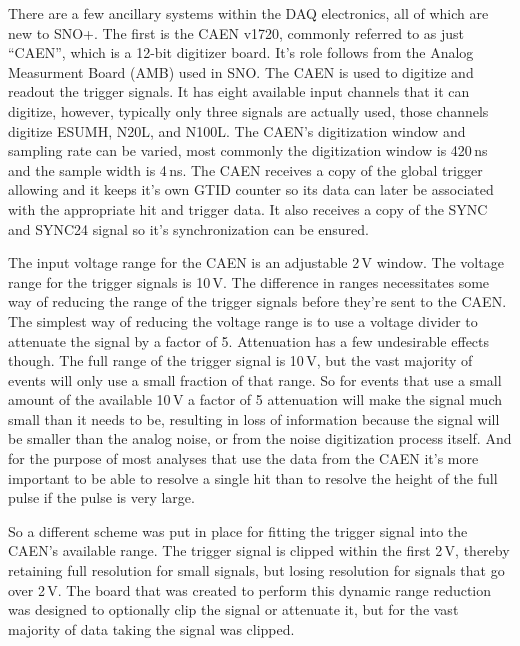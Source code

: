 There are a few ancillary systems within the DAQ electronics, all
of which are new to SNO+.
The first is the CAEN v1720, commonly
referred to as just ``CAEN'', which is a 12-bit digitizer board.
It's role follows from the Analog Measurment Board (AMB) used in
SNO.
The CAEN is used to digitize and readout the trigger signals.
It has eight available input channels that it can digitize, however,
typically only three signals are actually used, those channels digitize ESUMH, N20L, and
N100L. The CAEN's digitization window and sampling rate can be varied,
most commonly the digitization window is 420\,ns and the sample width
is 4\,ns. The CAEN receives a copy of the global trigger allowing and
it keeps it's own GTID counter so its data can later be associated
with the appropriate hit and trigger data. It also receives a copy of the
SYNC and SYNC24 signal so it's synchronization can be ensured.

The input voltage range for the CAEN is an adjustable 2\,V window.
The voltage range for the trigger signals is 10\,V.
The difference in ranges necessitates some way of reducing the range of the trigger signals
before they're sent to the CAEN.
The simplest way of reducing the voltage range is to use a voltage
divider to attenuate the signal by a factor of 5.
Attenuation has a few undesirable effects though.
The full range of the trigger signal is 10\,V, but the vast
majority of events will only use a small fraction of that range.
So for events that use a small amount of the available 10\,V a factor
of 5 attenuation will make the signal much small than it needs to be,
resulting in loss of information because the signal will be smaller than
the analog noise, or from the noise digitization process itself.
And for the purpose of most analyses that use the data from the CAEN
it's more important to be able to resolve a single hit than to resolve
the height of the full pulse if the pulse is very large.

So a different scheme was put in place for fitting the trigger signal
into the CAEN's available range. The trigger signal is clipped within
the first 2\,V, thereby retaining full resolution for small signals,
but losing resolution for signals that go over 2\,V.
The board that was created to perform this dynamic range reduction
was designed to optionally clip the signal or attenuate it, but
for the vast majority of data taking the signal was clipped.

